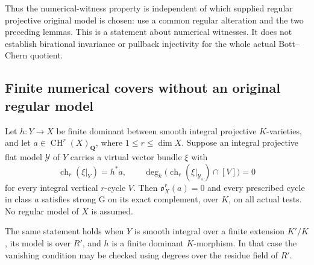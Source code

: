 Thus the numerical-witness property is independent of which supplied
regular projective original model is chosen: use a common regular
alteration and the two preceding lemmas.  This is a statement about
numerical witnesses.  It does not establish birational invariance or
pullback injectivity for the whole actual Bott--Chern quotient.

\subsection{Finite numerical covers without an original regular model}

\begin{theorem}
\label{r12a:finite-numerical-cover}
Let $h:Y\to X$ be finite dominant between smooth integral projective
$K$-varieties, and let $a\in\operatorname{CH}^r(X)_{\mathbf Q}$,
where $1\le r\le\dim X$.
Suppose an integral projective flat model $\mathcal Y$ of $Y$ carries
a virtual vector bundle $\xi$ with
\[
 \operatorname{ch}_r(\xi|_Y)=h^*a,
 \qquad
 \deg_k\bigl(\operatorname{ch}_r(\xi|_{\mathcal Y_s})\cap[V]\bigr)=0
\tag{ND6}\label{r12a:finite-numerical-data}
\]
for every integral vertical $r$-cycle $V$.
Then $\mathfrak o_X^r(a)=0$ and every prescribed cycle in class $a$
satisfies strong G on its exact complement, over $K$, on all actual
tests.  No regular model of $X$ is assumed.

The same statement holds when $Y$ is smooth integral over a finite
extension $K'/K$, its model is over $R'$, and $h$ is a finite dominant
$K$-morphism.  In that case the vanishing condition may be checked
using degrees over the residue field of $R'$.
\end{theorem}

